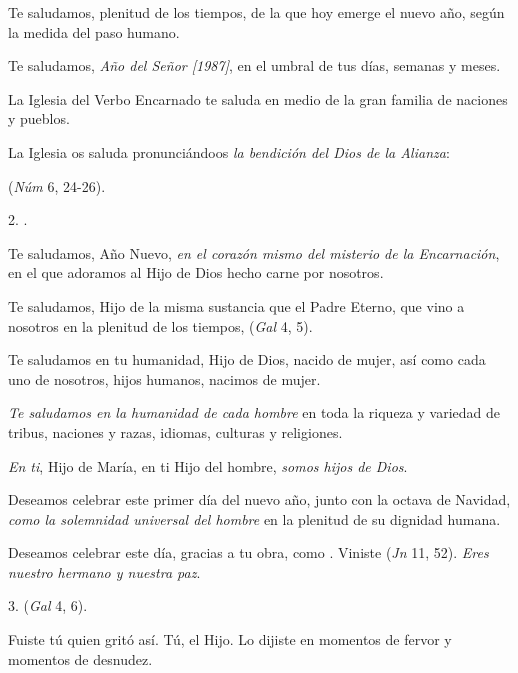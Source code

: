 \begin{body}
	Te saludamos, plenitud de los tiempos, de la que hoy emerge el nuevo año, según la medida del paso humano.
	
	Te saludamos, \emph{Año del Señor {[}1987{]}}, en el umbral de tus días, semanas y meses.
	
	La Iglesia del Verbo Encarnado te saluda en medio de la gran familia de naciones y pueblos.
	
	La Iglesia os saluda pronunciándoos \emph{la bendición del Dios de la 	Alianza}:
	
	 (\emph{Núm} 6, 24-26).
	
	2. .
	
	Te saludamos, Año Nuevo, \emph{en el corazón mismo del misterio de la 	Encarnación}, en el que adoramos al Hijo de Dios hecho carne por nosotros.
	
	Te saludamos, Hijo de la misma sustancia que el Padre Eterno, que vino a nosotros en la plenitud de los tiempos,  (\emph{Gal} 4, 5).
	
	Te saludamos en tu humanidad, Hijo de Dios, nacido de mujer, así como cada uno de nosotros, hijos humanos, nacimos de mujer.
	
	\emph{Te saludamos en la humanidad de cada hombre} en toda la riqueza y variedad de tribus, naciones y razas, idiomas, culturas y religiones.
	
	\emph{En ti}, Hijo de María, en ti Hijo del hombre, \emph{somos hijos de 	Dios}.
	
	Deseamos celebrar este primer día del nuevo año, junto con la octava de Navidad, \emph{como la solemnidad universal del hombre} en la plenitud de su dignidad humana.
	
	Deseamos celebrar este día, gracias a tu obra, como . Viniste  (\emph{Jn} 11, 52). \emph{Eres nuestro hermano y nuestra paz}.
	
	3.  (\emph{Gal} 4, 6).
	
	Fuiste tú quien gritó así. Tú, el Hijo. Lo dijiste en momentos de fervor y momentos de desnudez.
	

\end{body}

